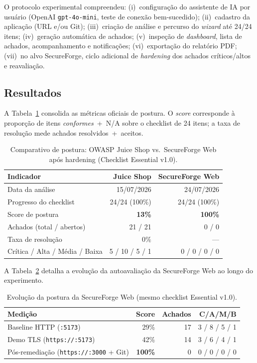 \documentclass[12pt]{article}
\begin{document}
O protocolo experimental compreendeu: (i)~configuração do assistente de IA por usuário (OpenAI \texttt{gpt-4o-mini}, teste de conexão bem-sucedido); (ii)~cadastro da aplicação (URL e/ou Git); (iii)~criação de análise e percurso do \emph{wizard} até 24/24 itens; (iv)~geração automática de achados; (v)~inspeção de \emph{dashboard}, lista de achados, acompanhamento e notificações; (vi)~exportação do relatório PDF; (vii)~no alvo SecureForge, ciclo adicional de \emph{hardening} dos achados críticos/altos e reavaliação.

\subsection{Resultados}
A Tabela~\ref{tab:comparativo} consolida as métricas oficiais de postura. O \emph{score} corresponde à proporção de itens \emph{conformes}~+~N/A sobre o checklist de 24 itens; a taxa de resolução mede achados resolvidos~+~aceitos.

\begin{table}[!ht]
\centering
\caption{Comparativo de postura: OWASP Juice Shop vs.\ SecureForge Web após hardening (Checklist Essential v1.0).}
\label{tab:comparativo}
\begin{tabular}{lrr}
\toprule
\textbf{Indicador} & \textbf{Juice Shop} & \textbf{SecureForge Web} \\
\midrule
Data da análise & 15/07/2026 & 24/07/2026 \\
Progresso do checklist & 24/24 (100\%) & 24/24 (100\%) \\
Score de postura & \textbf{13\%} & \textbf{100\%} \\
Achados (total / abertos) & 21 / 21 & 0 / 0 \\
Taxa de resolução & 0\% & --- \\
Crítica / Alta / Média / Baixa & 5 / 10 / 5 / 1 & 0 / 0 / 0 / 0 \\
\bottomrule
\end{tabular}
\end{table}

A Tabela~\ref{tab:evolucao} detalha a evolução da autoavaliação da SecureForge Web ao longo do experimento.

\begin{table}[!ht]
\centering
\caption{Evolução da postura da SecureForge Web (mesmo checklist Essential v1.0).}
\label{tab:evolucao}
\begin{tabular}{lrrr}
\toprule
\textbf{Medição} & \textbf{Score} & \textbf{Achados} & \textbf{C/A/M/B} \\
\midrule
Baseline HTTP (\texttt{:5173}) & 29\% & 17 & 3 / 8 / 5 / 1 \\
Demo TLS (\texttt{https://:5173}) & 42\% & 14 & 3 / 6 / 4 / 1 \\
Pós-remediação (\texttt{https://:3000} + Git) & \textbf{100\%} & 0 & 0 / 0 / 0 / 0 \\
\bottomrule
\end{tabular}
\end{table}
\end{document}
